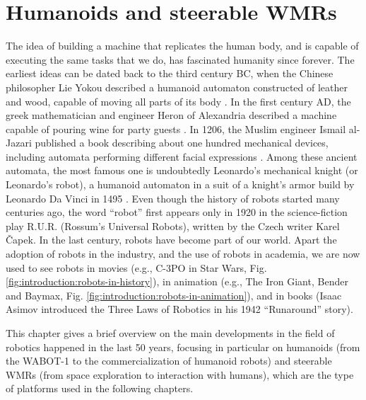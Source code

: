 \chapter{Humanoids and steerable WMRs}
\label{ch:humanoids-and-swmrs}
The idea of building a machine that replicates the human body, and is capable 
of executing the same tasks that we do, has fascinated humanity since forever.
The earliest ideas can be dated back to the third century BC, when the 
Chinese philosopher Lie Yokou described a humanoid automaton constructed of 
leather and wood, capable of moving all parts of its body
\cite{Needham1956ScienceandCivilisationinChinaVol2}. In the first century AD,
the greek mathematician and engineer Heron of Alexandria described a machine 
capable of pouring wine for party guests \cite{Alexandria2015Pneumatica}.
In 1206, the Muslim engineer Ismail al-Jazari published a book describing 
about one hundred mechanical devices, including automata performing different 
facial expressions \cite{AlJarari1206BookofKnowledge}. Among these ancient
automata, the most famous one is undoubtedly Leonardo's mechanical knight 
(or Leonardo's robot), a humanoid automaton in a suit of a knight's armor
build by Leonardo Da Vinci in 1495 \cite{Moran2006TheDaVinciRobot}.
Even though the history of robots started many centuries ago, the word ``robot''
first appears only in 1920 in the science-fiction play R.U.R.
(Rossum's Universal Robots), written by the Czech writer
Karel {\v C}apek.
In the last century, robots have become part of our world. Apart the adoption 
of robots in the industry, and the use of robots in academia, we are now 
used to see robots in movies (e.g., C-3PO in Star Wars,
Fig. \ref{fig:introduction:robots-in-history}), in animation (e.g., The Iron
Giant, Bender and Baymax, Fig.
\ref{fig:introduction:robots-in-animation}), and in books (Isaac Asimov
introduced the Three Laws of Robotics in his 1942 ``Runaround'' story).

This chapter gives a brief overview on the main developments in the field of 
robotics happened in the last 50 years, focusing in particular on humanoids
(from the WABOT-1 to the commercialization of humanoid robots)
and steerable WMRs (from space exploration to interaction with humans),
which are the type of platforms used in the following chapters.

